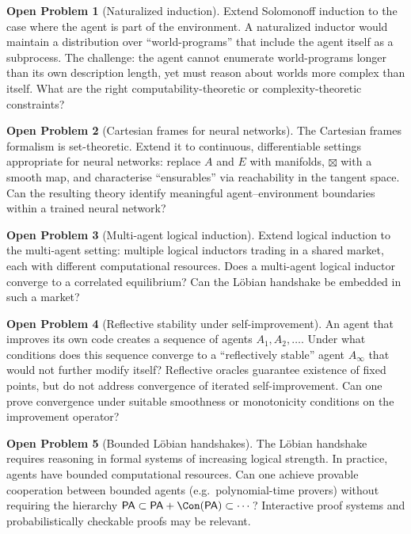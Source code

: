 \documentclass[11pt,a4paper]{article}
\theoremstyle{definition}
\newtheorem{problem}{Open Problem}
\theoremstyle{remark}
\newcommand{\PA}{\mathsf{PA}}
\begin{document}
\begin{problem}[Naturalized induction]
Extend Solomonoff induction to the case where the agent is part of the
environment.  A naturalized inductor would maintain a distribution over
``world-programs'' that include the agent itself as a subprocess.  The
challenge: the agent cannot enumerate world-programs longer than its own
description length, yet must reason about worlds more complex than
itself.  What are the right computability-theoretic or
complexity-theoretic constraints?
\end{problem}

\begin{problem}[Cartesian frames for neural networks]
The Cartesian frames formalism is set-theoretic.  Extend it to
continuous, differentiable settings appropriate for neural networks:
replace $A$ and $E$ with manifolds, $\boxtimes$ with a smooth map,
and characterise ``ensurables'' via reachability in the tangent space.
Can the resulting theory identify meaningful agent--environment
boundaries within a trained neural network?
\end{problem}

\begin{problem}[Multi-agent logical induction]
Extend logical induction to the multi-agent setting: multiple logical
inductors trading in a shared market, each with different computational
resources.  Does a multi-agent logical inductor converge to a correlated
equilibrium?  Can the L\"obian handshake be embedded in such a market?
\end{problem}

\begin{problem}[Reflective stability under self-improvement]
An agent that improves its own code creates a sequence of agents
$A_1, A_2, \ldots$.  Under what conditions does this sequence converge
to a ``reflectively stable'' agent $A_\infty$ that would not further
modify itself?  Reflective oracles guarantee existence of fixed points,
but do not address convergence of iterated self-improvement.  Can one
prove convergence under suitable smoothness or monotonicity conditions
on the improvement operator?
\end{problem}

\begin{problem}[Bounded L\"obian handshakes]
The L\"obian handshake requires reasoning in formal systems of
increasing logical strength.  In practice, agents have bounded
computational resources.  Can one achieve provable cooperation between
bounded agents (e.g.\ polynomial-time provers) without requiring the
hierarchy $\PA \subset \PA + \Con(\PA) \subset \cdots$?  Interactive
proof systems and probabilistically checkable proofs may be relevant.
\end{problem}
\end{document}
